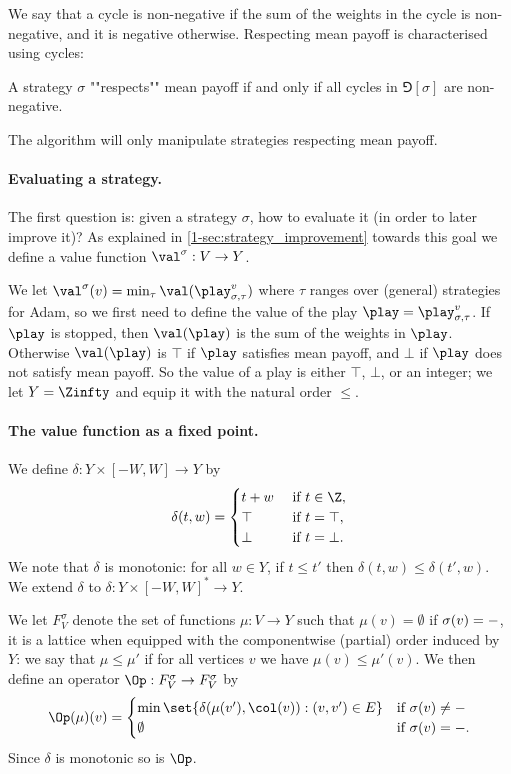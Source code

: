 We say that a cycle is non-negative if the sum of the weights in the cycle is non-negative, and it is negative otherwise. 
Respecting mean payoff is characterised using cycles:
\begin{fact}
A strategy $\sigma$ ""respects"" mean payoff if and only if all cycles in $\Game[\sigma]$ are non-negative.
\end{fact}
The algorithm will only manipulate strategies respecting mean payoff.

\paragraph{\bf Evaluating a strategy.}
The first question is: given a strategy $\sigma$, how to evaluate it (in order to later improve it)?
As explained in \cref{1-sec:strategy_improvement} towards this goal we define a value function $\val^{\sigma} : V \to Y$.

We let $\val^{\sigma}(v) = \min_\tau \val(\play_{\sigma,\tau}^v)$ where $\tau$ ranges over (general) strategies for Adam, so we first need to define the value of the play $\play = \play_{\sigma,\tau}^v$.
If $\play$ is stopped, then $\val(\play)$ is the sum of the weights in $\play$.
Otherwise $\val(\play)$ is $\top$ if $\play$ satisfies mean payoff, and $\bot$ if $\play$ does not satisfy mean payoff.
So the value of a play is either $\top$, $\bot$, or an integer;
we let $Y = \Zinfty$ and equip it with the natural order $\le$.

\paragraph{\bf The value function as a fixed point.}
We define $\delta : Y \times [-W,W] \to Y$ by 
\[
\delta(t,w) = 
\begin{cases}
t + w & \text{ if } t \in \Z, \\
\top & \text{ if } t = \top, \\
\bot & \text{ if } t = \bot.
\end{cases}
\]
We note that $\delta$ is monotonic: for all $w \in Y$,
if $t \le t'$ then $\delta(t,w) \le \delta(t',w)$. 
We extend $\delta$ to $\delta : Y \times [-W,W]^* \to Y$.

We let $F^\sigma_V$ denote the set of functions $\mu : V \to Y$ such that $\mu(v) = \emptyset$ if $\sigma(v) = \mathtt{-}$,
it is a lattice when equipped with the componentwise (partial) order induced by $Y$:
we say that $\mu \le \mu'$ if for all vertices $v$ we have $\mu(v) \le \mu'(v)$.
We then define an operator $\Op : F^\sigma_V \to F^\sigma_V$ by
\[
\Op(\mu)(v) = 
\begin{cases}
\min \set{\delta( \mu(v'), \col(v)) : (v,v') \in E} & \text{if } \sigma(v) \neq \siblank \\
\emptyset 											& \text{if } \sigma(v) = \siblank.
\end{cases}
\]
Since $\delta$ is monotonic so is $\Op$.

